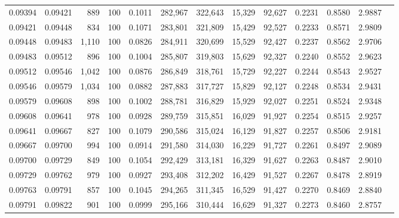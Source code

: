 \begin{tabular}{rrrrrrrrrrrrr}
0.09394 & 0.09421 &   889 & 100 &                                     0.1011 & 282,967 & 322,643 &  15,329 &  92,627 & 0.2231 & 0.8580 & 2.9887 \\
0.09421 & 0.09448 &   834 & 100 &                                     0.1071 & 283,801 & 321,809 &  15,429 &  92,527 & 0.2233 & 0.8571 & 2.9809 \\
0.09448 & 0.09483 & 1,110 & 100 &                                     0.0826 & 284,911 & 320,699 &  15,529 &  92,427 & 0.2237 & 0.8562 & 2.9706 \\
0.09483 & 0.09512 &   896 & 100 &                                     0.1004 & 285,807 & 319,803 &  15,629 &  92,327 & 0.2240 & 0.8552 & 2.9623 \\
0.09512 & 0.09546 & 1,042 & 100 &                                     0.0876 & 286,849 & 318,761 &  15,729 &  92,227 & 0.2244 & 0.8543 & 2.9527 \\
0.09546 & 0.09579 & 1,034 & 100 &                                     0.0882 & 287,883 & 317,727 &  15,829 &  92,127 & 0.2248 & 0.8534 & 2.9431 \\
0.09579 & 0.09608 &   898 & 100 &                                     0.1002 & 288,781 & 316,829 &  15,929 &  92,027 & 0.2251 & 0.8524 & 2.9348 \\
0.09608 & 0.09641 &   978 & 100 &                                     0.0928 & 289,759 & 315,851 &  16,029 &  91,927 & 0.2254 & 0.8515 & 2.9257 \\
0.09641 & 0.09667 &   827 & 100 &                                     0.1079 & 290,586 & 315,024 &  16,129 &  91,827 & 0.2257 & 0.8506 & 2.9181 \\
0.09667 & 0.09700 &   994 & 100 &                                     0.0914 & 291,580 & 314,030 &  16,229 &  91,727 & 0.2261 & 0.8497 & 2.9089 \\
0.09700 & 0.09729 &   849 & 100 &                                     0.1054 & 292,429 & 313,181 &  16,329 &  91,627 & 0.2263 & 0.8487 & 2.9010 \\
0.09729 & 0.09762 &   979 & 100 &                                     0.0927 & 293,408 & 312,202 &  16,429 &  91,527 & 0.2267 & 0.8478 & 2.8919 \\
0.09763 & 0.09791 &   857 & 100 &                                     0.1045 & 294,265 & 311,345 &  16,529 &  91,427 & 0.2270 & 0.8469 & 2.8840 \\
0.09791 & 0.09822 &   901 & 100 &                                     0.0999 & 295,166 & 310,444 &  16,629 &  91,327 & 0.2273 & 0.8460 & 2.8757 \\

\end{tabular}
